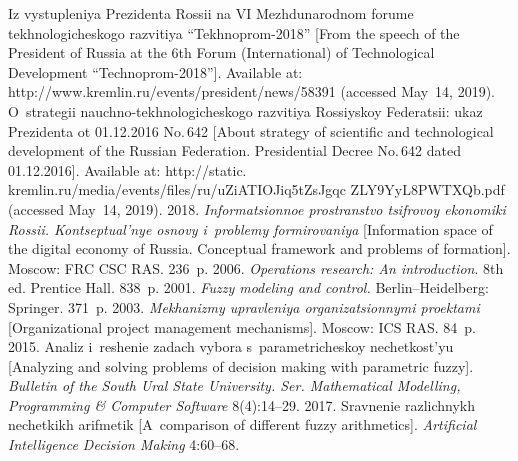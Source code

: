   \begin{multicols}{2}

\renewcommand{\bibname}{\protect\rmfamily References}

{\small\frenchspacing
 {%
 \begin{thebibliography}{99}
Iz vystupleniya Prezidenta Rossii na VI Mezhdunarodnom forume 
tekhnologicheskogo razvitiya ``Tekhnoprom-2018'' [From the speech of the 
President of Russia at the 6th  Forum (International) of Technological 
Development ``Technoprom-2018'']. Available at: 
{\sf http://www.\linebreak kremlin.ru/events/president/news/58391} (accessed May~14, 
2019).
O~strategii nauchno-tekhnologicheskogo razvitiya Ros\-siy\-skoy Federatsii: 
ukaz Prezidenta ot 01.12.2016 No.\,642 [About strategy of scientific and 
technological development of the Russian Federation. Presidential Decree 
No.\,642 dated 01.12.2016]. Available at:  
{\sf http://static.\linebreak
 kremlin.ru/media/events/files/ru/uZiATIOJiq5tZsJgqc ZLY9YyL8PWTXQb.pdf}
 (accessed May~14, 2019).
 2018. 
\textit{Informatsionnoe prostranstvo tsifrovoy ekonomiki Rossii. Kontseptual'nye 
osnovy i~problemy formirovaniya} [Information space of the digital economy 
of Russia. Conceptual framework and problems of formation]. Moscow: 
FRC CSC RAS. 236~p.
 2006. \textit{Operations research: An introduction}. 8th ed. 
Prentice Hall. 838~p.
 2001. \textit{Fuzzy modeling and control.} Berlin--Heidelberg:
Springer. 371~p.
 2003. \textit{Mekhanizmy 
upravleniya organizatsionnymi proektami} [Organizational project 
management mechanisms]. Moscow: ICS RAS. 84~p.
 2015. Analiz i~reshenie zadach vybora s~parametricheskoy 
nechetkost'yu [Analyzing and solving problems of decision making
with parametric 
fuzzy]. \textit{Bulletin of 
the South Ural State University. Ser. Mathematical Modelling, 
Programming \& Computer Software} 8(4):14--29.
 2017. Sravnenie razlichnykh 
nechetkikh arifmetik [A~comparison of different fuzzy arithmetics]. 
\textit{Artificial Intelligence  
Decision Making} 4:60--68.

\end{thebibliography}}}
\end{multicols}
